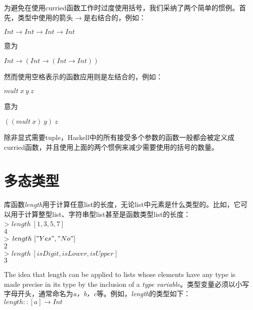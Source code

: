 为避免在使用curried函数工作时过度使用括号，我们采纳了两个简单的惯例。首先，类型中使用的箭头$\rightarrow$是右结合的，例如：

\noindent\hspace*{1cm} $Int \rightarrow Int \rightarrow Int \rightarrow Int$

意为

\noindent\hspace*{1cm} $Int \rightarrow (Int \rightarrow (Int \rightarrow Int))$

然而使用空格表示的函数应用则是左结合的，例如：

\noindent\hspace*{1cm} $mult~x~y~z$

意为

\noindent\hspace*{1cm} $((mult~x)~y)~z$

除非显式需要tuple，Haskell中的所有接受多个参数的函数一般都会被定义成curried函数，并且使用上面的两个惯例来减少需要使用的括号的数量。

\section{多态类型}
库函数\textit{length}用于计算任意list的长度，无论list中元素是什么类型的。比如，它可以用于计算整型list、字符串型list甚至是函数类型list的长度：\\
\hspace*{1cm} > $length~[1, 3, 5, 7]$\\
\hspace*{1cm} $4$\\
\hspace*{1cm} > $length~["Yes", "No"]$\\
\hspace*{1cm} $2$\\
\hspace*{1cm} > $length~[isDigit , isLower , isUpper]$\\
\hspace*{1cm} $3$

The idea that length can be applied to lists whose elements have any type is
made precise in its type by the inclusion of a \textit{type
variable}。类型变量必须以小写字母开头，通常命名为\textit{a，b，c}等。例如，\textit{length}的类型如下：\\
\hspace*{1cm} $length :: [a] \rightarrow Int$

